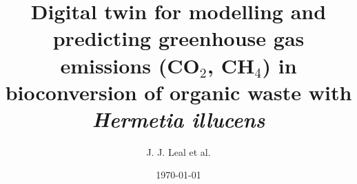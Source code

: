 \documentclass[11pt,a4paper]{article}
\title{Digital twin for modelling and predicting greenhouse gas
emissions (CO$_2$, CH$_4$) in bioconversion of organic waste
with \emph{Hermetia illucens}}
\author{J. J. Leal et al.}
\date{\today}
\begin{document}
\maketitle
\begin{abstract}
\end{abstract}






\printbibliography
\end{document}
